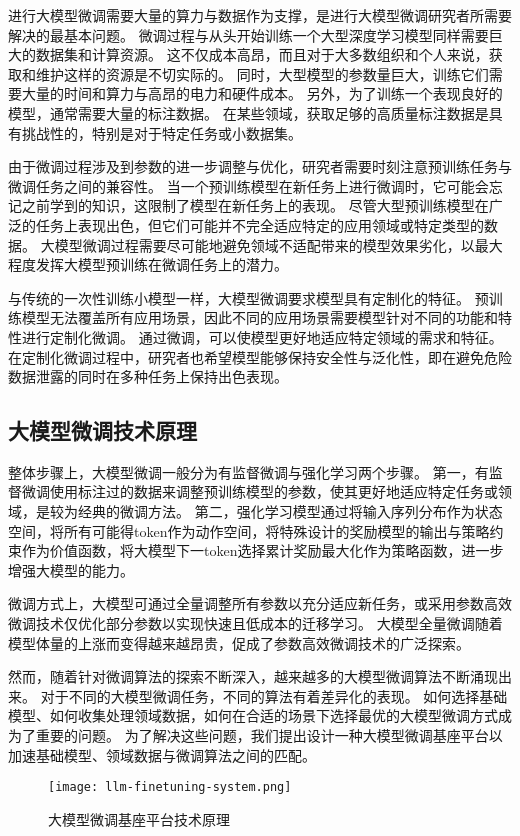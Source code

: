 进行大模型微调需要大量的算力与数据作为支撑，是进行大模型微调研究者所需要解决的最基本问题。
微调过程与从头开始训练一个大型深度学习模型同样需要巨大的数据集和计算资源。
这不仅成本高昂，而且对于大多数组织和个人来说，获取和维护这样的资源是不切实际的。
同时，大型模型的参数量巨大，训练它们需要大量的时间和算力与高昂的电力和硬件成本。
另外，为了训练一个表现良好的模型，通常需要大量的标注数据。
在某些领域，获取足够的高质量标注数据是具有挑战性的，特别是对于特定任务或小数据集。

由于微调过程涉及到参数的进一步调整与优化，研究者需要时刻注意预训练任务与微调任务之间的兼容性。
当一个预训练模型在新任务上进行微调时，它可能会忘记之前学到的知识，这限制了模型在新任务上的表现。
尽管大型预训练模型在广泛的任务上表现出色，但它们可能并不完全适应特定的应用领域或特定类型的数据。
大模型微调过程需要尽可能地避免领域不适配带来的模型效果劣化，以最大程度发挥大模型预训练在微调任务上的潜力。

与传统的一次性训练小模型一样，大模型微调要求模型具有定制化的特征。
预训练模型无法覆盖所有应用场景，因此不同的应用场景需要模型针对不同的功能和特性进行定制化微调。
通过微调，可以使模型更好地适应特定领域的需求和特征。
在定制化微调过程中，研究者也希望模型能够保持安全性与泛化性，即在避免危险数据泄露的同时在多种任务上保持出色表现。

\subsection{大模型微调技术原理}

整体步骤上，大模型微调一般分为有监督微调与强化学习两个步骤。
第一，有监督微调使用标注过的数据来调整预训练模型的参数，使其更好地适应特定任务或领域，是较为经典的微调方法。
第二，强化学习模型通过将输入序列分布作为状态空间，将所有可能得token作为动作空间，将特殊设计的奖励模型的输出与策略约束作为价值函数，将大模型下一token选择累计奖励最大化作为策略函数，进一步增强大模型的能力。

微调方式上，大模型可通过全量调整所有参数以充分适应新任务，或采用参数高效微调技术仅优化部分参数以实现快速且低成本的迁移学习。
大模型全量微调随着模型体量的上涨而变得越来越昂贵，促成了参数高效微调技术的广泛探索。

然而，随着针对微调算法的探索不断深入，越来越多的大模型微调算法不断涌现出来。
对于不同的大模型微调任务，不同的算法有着差异化的表现。
如何选择基础模型、如何收集处理领域数据，如何在合适的场景下选择最优的大模型微调方式成为了重要的问题。
为了解决这些问题，我们提出设计一种大模型微调基座平台以加速基础模型、领域数据与微调算法之间的匹配。

\begin{figure}
  \centering
  \texttt{[image: llm-finetuning-system.png]}
  \caption{大模型微调基座平台技术原理}
  \label{fig:finetuningsys}
\end{figure}

